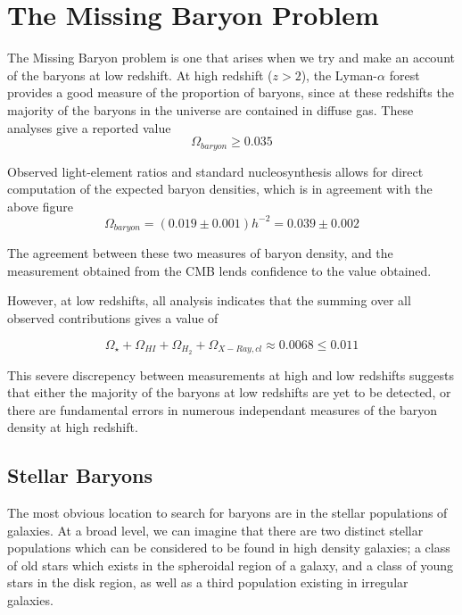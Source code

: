 \chapter{The Missing Baryon Problem}

The Missing Baryon problem is one that arises when we try and make an account of the baryons at low redshift. At high redshift ($z>2$), the Lyman-$\alpha$ forest provides a good measure of the proportion of baryons, since at these redshifts the majority of the baryons in the universe are contained in diffuse gas. These analyses give a reported value 
$$\Omega_{baryon} \geq 0.035 $$ 

Observed light-element ratios and standard nucleosynthesis allows for direct computation of the expected baryon densities, which is in agreement with the above figure \citep{1998sese.conf..113B}
$$\Omega_{baryon} = (0.019\pm 0.001)h^{-2} = 0.039 \pm 0.002 $$

The agreement between these two measures of baryon density, and the measurement obtained from the CMB lends confidence to the value obtained. 

\par However, at low redshifts, all analysis indicates that the summing over all observed contributions gives a value of 

$$\Omega_\star + \Omega_{HI} + \Omega_{H_2} + \Omega_{X-Ray,cl} \approx 0.0068 \leq 0.011 $$

This severe discrepency between measurements at high and low redshifts suggests that either the majority of the baryons at low redshifts are yet to be detected, or there are fundamental errors in numerous independant measures of the baryon density at high redshift. 

\section{Stellar Baryons}
The most obvious location to search for baryons are in the stellar populations of galaxies. At a broad level, we can imagine that there are two distinct stellar populations which can be considered to be found in high density galaxies; a class of old stars which exists in the spheroidal region of a galaxy, and a class of young stars in the disk region, as well as a third population existing in irregular galaxies.

